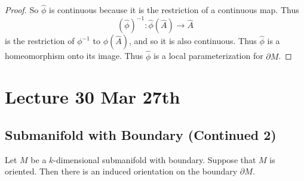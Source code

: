\documentclass[notoc,notitlepage]{tufte-book}
\begin{document}
\begin{proof}
  So $\hat{\phi}$ is continuous because it is the restriction of a continuous
  map. Thus
  \begin{equation*}
    (\hat{\phi})^{-1} : \hat{\phi}(\hat{A}) \to \hat{A}
  \end{equation*}
  is the restriction of $\phi^{-1}$ to $\phi(\hat{A})$, and so it is also
  continuous. Thus $\hat{\phi}$ is a homeomorphism onto its image. Thus
  $\hat{\phi}$ is a local parameterization for $\partial M$.
\end{proof}



\chapter{Lecture 30 Mar 27th}%
\label{chp:lecture_30_mar_27th}

\section{Submanifold with Boundary (Continued 2)}%
\label{sec:submanifold_with_boundary_continued_2}

\begin{propo}\label{propo:oriented_manifolds_with_boundary_has_an_oriented_boundary}
  Let $M$ be a $k$-dimensional submanifold with boundary. Suppose that $M$ is
  oriented. Then there is an induced orientation on the boundary $\partial M$.
\end{propo}
\end{document}
